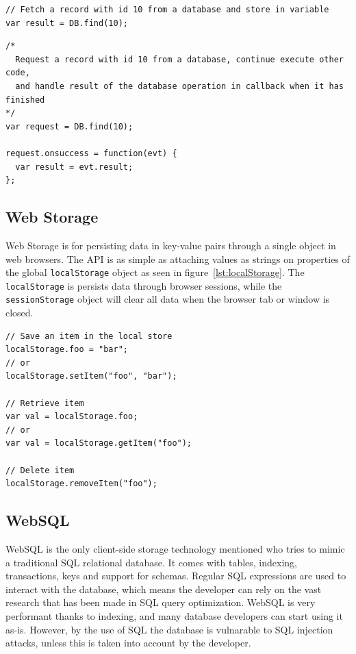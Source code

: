 \begin{Code}
\begin{lstlisting}[caption={Synchronous call}, label={lst:syncCall}]
// Fetch a record with id 10 from a database and store in variable
var result = DB.find(10);
\end{lstlisting}

\begin{lstlisting}[caption={Asynchronous call}, label={lst:asyncCall}]
/*
  Request a record with id 10 from a database, continue execute other code,
  and handle result of the database operation in callback when it has finished
*/
var request = DB.find(10);

request.onsuccess = function(evt) {
  var result = evt.result;
};
\end{lstlisting}
\end{Code}


\subsection{Web Storage}

Web Storage is for persisting data in key-value pairs through a single object in web browsers. The API is as simple as attaching values as strings on properties of the global \texttt{localStorage} object as seen in figure~\ref{lst:localStorage}. The \texttt{localStorage} is persists data through browser sessions, while the \texttt{sessionStorage} object will clear all data when the browser tab or window is closed.

\begin{Code}
\begin{lstlisting}[caption={Use of Web Storage}, label={lst:localStorage}]
// Save an item in the local store
localStorage.foo = "bar";
// or
localStorage.setItem("foo", "bar");

// Retrieve item
var val = localStorage.foo;
// or
var val = localStorage.getItem("foo");

// Delete item
localStorage.removeItem("foo");
\end{lstlisting}
\end{Code}

\subsection{WebSQL}
\label{sec:websql}
WebSQL is the only client-side storage technology mentioned who tries to mimic a traditional SQL relational database. It comes with tables, indexing, transactions, keys and support for schemas. Regular SQL expressions are used to interact with the database, which means the developer can rely on the vast research that has been made in SQL query optimization. WebSQL is very performant thanks to indexing, and many database developers can start using it as-is. However, by the use of SQL the database is vulnarable to SQL injection attacks, unless this is taken into account by the developer.

